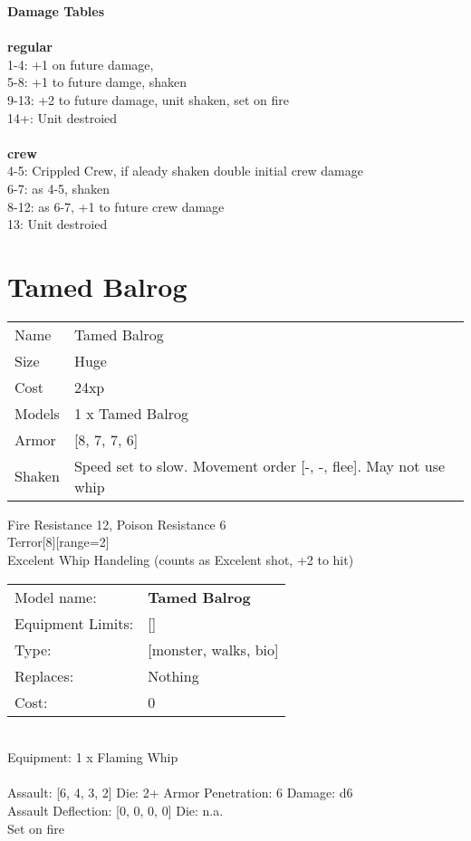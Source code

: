 {\bf Damage Tables} \\
\ \\ {\bf regular } \\
1-4: +1 on future damage, \\
5-8: +1 to future damge, shaken \\
9-13: +2 to future damage, unit shaken, set on fire \\
14+: Unit destroied \\
\ \\ {\bf crew } \\
4-5: Crippled Crew, if aleady shaken double initial crew damage \\
6-7: as 4-5, shaken \\
8-12: as 6-7, +1 to future crew damage \\
13: Unit destroied \\










\pagebreak\pagebreak

\section{ Tamed Balrog }

\begin{tabular}{ll}
  Name & Tamed Balrog \\
  Size & Huge\\
  Cost & 24xp\\
  Models & 1 x Tamed Balrog\\
  Armor & [8, 7, 7, 6]\\
  Shaken & Speed set to slow. Movement order [-, -, flee]. May not use whip\\
\end{tabular}

\noindent Fire Resistance 12, Poison Resistance 6\\ 
Terror[8][range=2]\\ 
Excelent Whip Handeling (counts as Excelent shot, +2 to hit)\\ 


\noindent
\begin{tabular}{ll}
Model name: &{\bf Tamed Balrog } \\
Equipment Limits: &[] \\
Type: &[monster, walks, bio] \\
Replaces: &Nothing \\
Cost: & 0\\
\end{tabular}
\ \\
Equipment: 1 x Flaming Whip \\
\ \\
Assault: [6, 4, 3, 2] Die: 2+ Armor Penetration: 6 Damage: d6 \\
Assault Deflection: [0, 0, 0, 0] Die: n.a.\\
\indent Set on fire\\ 
 
